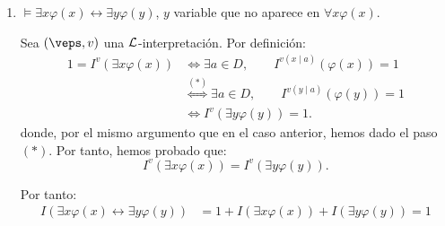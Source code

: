 \begin{ejercicio}
\begin{enumerate}
        Por tanto:
        \begin{align*}
            I( \forall x \varphi(x) \leftrightarrow \forall y \varphi(y))
            &= 1+I(\forall x \varphi(x))+I(\forall y \varphi(y))=1
        \end{align*}
        \item $\models \exists x \varphi(x) \leftrightarrow \exists y \varphi(y)$, $y$ variable que no aparece en $\forall x \varphi(x)$.
        
        
        Sea $(\veps,v)$ una $\mathcal{L}$-interpretación. Por definición:
        \begin{align*}
            1 = I^v(\exists x \varphi(x))
            &\iff \exists a\in D,\qquad I^{v(x\mid a)}(\varphi(x)) = 1\\
            &\stackrel{(\ast)}{\iff} \exists a\in D,\qquad I^{v(y\mid a)}(\varphi(y)) = 1\\
            &\iff I^v(\exists y \varphi(y)) = 1.
        \end{align*}
        donde, por el mismo argumento que en el caso anterior, hemos dado el paso $(\ast)$.
        Por tanto, hemos probado que:
        \begin{equation*}
            I^v(\exists x \varphi(x)) = I^v(\exists y \varphi(y)).
        \end{equation*}

        Por tanto:
        \begin{align*}
            I( \exists x \varphi(x) \leftrightarrow \exists y \varphi(y))
            &= 1+I(\exists x \varphi(x))+I(\exists y \varphi(y))=1
        \end{align*}
    \end{enumerate}
\end{ejercicio}

